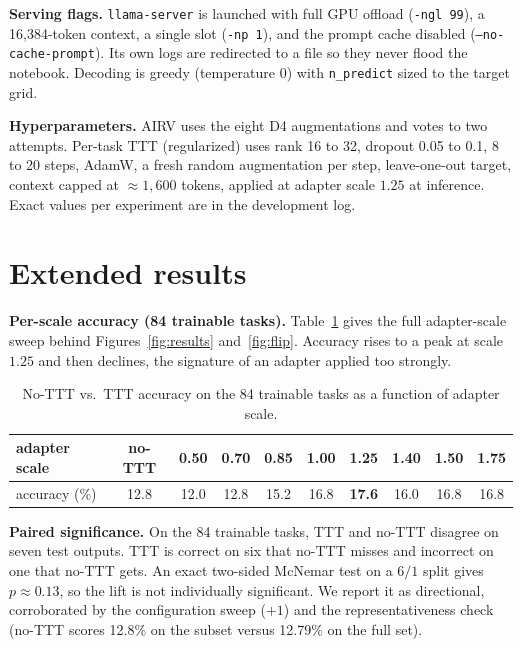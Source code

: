 \documentclass[11pt]{article}
\begin{document}
\textbf{Serving flags.} \texttt{llama-server} is launched with full GPU offload
(\texttt{-ngl~99}), a 16{,}384-token context, a single slot (\texttt{-np~1}), and the prompt cache
disabled (\texttt{--no-cache-prompt}). Its own logs are redirected to a file so they never flood the
notebook. Decoding is greedy (temperature $0$) with \texttt{n\_predict} sized to the target grid.

\textbf{Hyperparameters.} AIRV uses the eight D4 augmentations and votes to two attempts. Per-task
TTT (regularized) uses rank 16 to 32, dropout 0.05 to 0.1, 8 to 20 steps, AdamW, a fresh random
augmentation per step, leave-one-out target, context capped at $\approx 1{,}600$ tokens, applied at
adapter scale $1.25$ at inference. Exact values per experiment are in the development log.

\section{Extended results}
\label{app:results}

\textbf{Per-scale accuracy (84 trainable tasks).} Table~\ref{tab:perscale} gives the full
adapter-scale sweep behind Figures~\ref{fig:results} and~\ref{fig:flip}. Accuracy rises to a peak at
scale~$1.25$ and then declines, the signature of an adapter applied too strongly.

\begin{table}[H]
\centering
\caption{No-TTT vs.\ TTT accuracy on the 84 trainable tasks as a function of adapter scale.}
\label{tab:perscale}
\begin{tabular}{lccccccccc}
\toprule
adapter scale & no-TTT & 0.50 & 0.70 & 0.85 & 1.00 & \textbf{1.25} & 1.40 & 1.50 & 1.75 \\
\midrule
accuracy (\%) & 12.8 & 12.0 & 12.8 & 15.2 & 16.8 & \textbf{17.6} & 16.0 & 16.8 & 16.8 \\
\bottomrule
\end{tabular}
\end{table}

\textbf{Paired significance.} On the 84 trainable tasks, TTT and no-TTT disagree on seven test
outputs. TTT is correct on six that no-TTT misses and incorrect on one that no-TTT gets. An exact
two-sided McNemar test on a $6/1$ split gives $p\approx0.13$, so the lift is not individually
significant. We report it as directional, corroborated by the configuration sweep ($+1$) and the
representativeness check (no-TTT scores 12.8\% on the subset versus 12.79\% on the full set).
\end{document}
